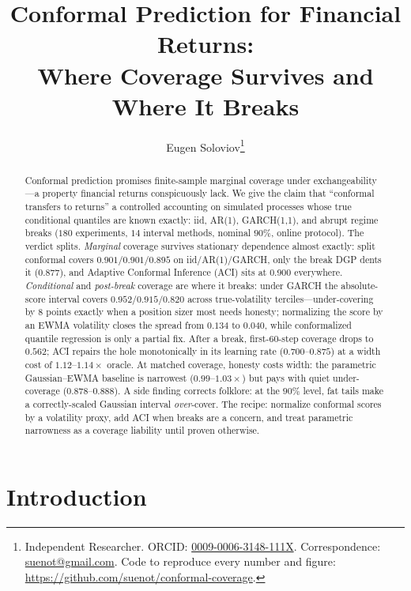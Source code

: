 \documentclass[11pt]{article}
\title{\bfseries Conformal Prediction for Financial Returns:\\
Where Coverage Survives and Where It Breaks}
\author{Eugen Soloviov\thanks{Independent Researcher. ORCID:
\href{https://orcid.org/0009-0006-3148-111X}{0009-0006-3148-111X}.
Correspondence: \href{mailto:suenot@gmail.com}{suenot@gmail.com}.
Code to reproduce every number and figure:
\url{https://github.com/suenot/conformal-coverage}.}}
\date{}
\begin{document}
\maketitle

\begin{abstract}
Conformal prediction promises finite-sample marginal coverage under
exchangeability---a property financial returns conspicuously lack. We give the
claim that ``conformal transfers to returns'' a controlled accounting on
simulated processes whose true conditional quantiles are known exactly: iid,
AR(1), GARCH(1,1), and abrupt regime breaks ($180$ experiments, $14$ interval
methods, nominal $90\%$, online protocol). The verdict splits. \emph{Marginal}
coverage survives stationary dependence almost exactly: split conformal covers
$0.901/0.901/0.895$ on iid/AR(1)/GARCH, only the break DGP dents it
($0.877$), and Adaptive Conformal Inference (ACI) sits at $0.900$ everywhere.
\emph{Conditional} and \emph{post-break} coverage are where it breaks: under
GARCH the absolute-score interval covers $0.952/0.915/0.820$ across
true-volatility terciles---under-covering by $8$ points exactly when a
position sizer most needs honesty; normalizing the score by an EWMA volatility
closes the spread from $0.134$ to $0.040$, while conformalized quantile
regression is only a partial fix. After a break, first-$60$-step coverage
drops to $0.562$; ACI repairs the hole monotonically in its learning rate
($0.700$--$0.875$) at a width cost of $1.12$--$1.14\times$ oracle. At matched
coverage, honesty costs width: the parametric Gaussian--EWMA baseline is
narrowest ($0.99$--$1.03\times$) but pays with quiet under-coverage
($0.878$--$0.888$). A side finding corrects folklore: at the $90\%$ level,
fat tails make a correctly-scaled Gaussian interval \emph{over}-cover. The
recipe: normalize conformal scores by a volatility proxy, add ACI when breaks
are a concern, and treat parametric narrowness as a coverage liability until
proven otherwise.
\end{abstract}

\section{Introduction}
\end{document}
